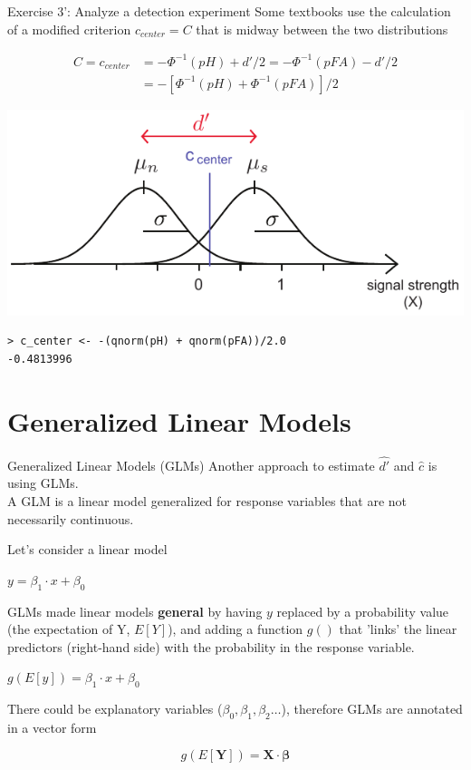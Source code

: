 \documentclass[10pt]{beamer}
\begin{document}
\begin{frame}[fragile]{Exercise 3': Analyze a detection experiment}
Some textbooks use the calculation of a modified criterion $c_{center} = C$ that is midway between the two distributions

\begin{align*}
C = c_{center} & = -\Phi^{-1}(pH) + d'/2 = -\Phi^{-1}(pFA) - d'/2 \\
& = -[\Phi^{-1}(pH) + \Phi^{-1}(pFA)]/2 
\end{align*}

\begin{center}
\includegraphics[scale=0.8]{figs/c_center.pdf}
\end{center}

\pause
\begin{verbatim}
> c_center <- -(qnorm(pH) + qnorm(pFA))/2.0
-0.4813996
\end{verbatim}


\end{frame}

\section{Generalized Linear Models}
\begin{frame}{Generalized Linear Models (GLMs)}
Another approach to estimate $\hat{d'}$ and $\hat{c}$ is using GLMs.\\[5pt]

A GLM is a linear model generalized for response variables that are not necessarily continuous. 

Let's consider a linear model
\begin{center}
$y = \beta_1 \cdot x + \beta_0$
\end{center}

GLMs made linear models \textbf{general} by having $y$ replaced by a probability value (the expectation of Y, $E[Y]$), and adding a function $g()$ that 'links' the linear predictors (right-hand side) with the probability in the response variable.

\begin{center}
$g(E[y])= \beta_1 \cdot x + \beta_0$
\end{center}

There could be  explanatory variables ($\beta_0, \beta_1, \beta_2 \dots$), therefore GLMs are  annotated in a vector form 

$$
g(E[\mathbf{Y}]) = \mathbf{X} \cdot \mathbf{\beta}
$$

\end{frame}
\end{document}
